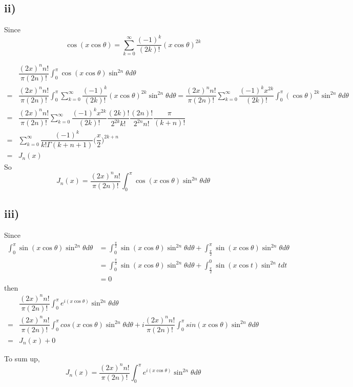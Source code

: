 \documentclass[a4paper,12pt,titlepage]{article}
\begin{document}
\subsection*{ii)}
Since
$$\cos(x\cos\theta)=\sum\limits_{k=0}^{\infty}\dfrac{(-1)^k}{(2k)!}(x\cos\theta)^{2k}$$

\begin{align*}
&\dfrac{(2x)^nn!}{\pi(2n)!}\int_0^{\pi}\cos(x\cos\theta)\sin^{2n}\theta d\theta\\
=&\dfrac{(2x)^nn!}{\pi(2n)!}\int_0^{\pi}\sum\limits_{k=0}^{\infty}\dfrac{(-1)^k}{(2k)!}(x\cos\theta)^{2k}\sin^{2n}\theta d\theta=\dfrac{(2x)^nn!}{\pi(2n)!}\sum\limits_{k=0}^{\infty}\dfrac{(-1)^kx^{2k}}{(2k)!}\int_0^{\pi}(\cos\theta)^{2k}\sin^{2n}\theta d\theta\\
=&\dfrac{(2x)^nn!}{\pi(2n)!}\sum\limits_{k=0}^{\infty}\dfrac{(-1)^kx^{2k}}{(2k)!}\dfrac{(2k)!}{2^{2k}k!}\dfrac{(2n)!}{2^{2n}n!}\dfrac{\pi}{(k+n)!}\\
=&\sum\limits_{k=0}^{\infty}\dfrac{(-1)^k}{k!\Gamma(k+n+1)}\Big(\dfrac{x}{2}\Big)^{2k+n}\\
=&J_n(x)
\end{align*}
So
$$J_n(x)=\dfrac{(2x)^nn!}{\pi(2n)!}\int_0^{\pi}\cos(x\cos\theta)\sin^{2n}\theta d\theta$$

\subsection*{iii)}
Since
\begin{align*}
\int_0^{\pi}\sin(x\cos\theta)\sin^{2n}\theta d\theta
&=\int_0^{\frac{\pi}{2}}\sin(x\cos\theta)\sin^{2n}\theta d\theta+\int^{\pi}_{\frac{\pi}{2}}\sin(x\cos\theta)\sin^{2n}\theta d\theta\\
&=\int_0^{\frac{\pi}{2}}\sin(x\cos\theta)\sin^{2n}\theta d\theta+\int^{0}_{\frac{\pi}{2}}\sin(x\cos t)\sin^{2n}t dt\\
&=0
\end{align*}
then
\begin{align*}
&\dfrac{(2x)^nn!}{\pi(2n)!}\int_0^{\pi}e^{i(x\cos\theta)}\sin^{2n}\theta d\theta\\
=&\dfrac{(2x)^nn!}{\pi(2n)!}\int_0^{\pi}cos(x\cos\theta)\sin^{2n}\theta d\theta+i\dfrac{(2x)^nn!}{\pi(2n)!}\int_0^{\pi}sin(x\cos\theta)\sin^{2n}\theta d\theta\\
=&J_n(x)+0
\end{align*}

To sum up,
$$J_n(x)=\dfrac{(2x)^nn!}{\pi(2n)!}\int_0^{\pi}e^{i(x\cos\theta)}\sin^{2n}\theta d\theta$$
\end{document}
